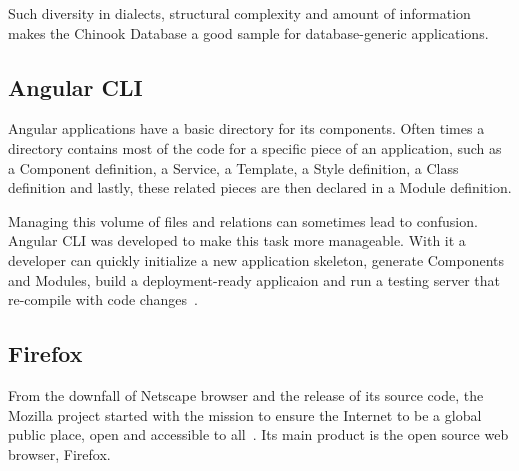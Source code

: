 Such diversity in dialects, structural complexity and amount of information makes the Chinook Database a good sample for database-generic applications.

\subsection{Angular CLI}\label{angularcli}
Angular applications have a basic directory for its components. Often times a directory contains most of the code for a specific piece of an application, such as a Component definition, a Service, a Template, a Style definition, a Class definition and lastly, these related pieces are then declared in a Module definition.

Managing this volume of files and relations can sometimes lead to confusion. Angular \gls{CLI} was developed to make this task more manageable. With it a developer can quickly initialize a new application skeleton, generate Components and Modules, build a deployment-ready applicaion and run a testing server that re-compile with code changes~\cite{angularcli}.

\subsection{Firefox}
From the downfall of Netscape browser and the release of its source code, the Mozilla project started with the mission to ensure the Internet to be a global public place, open and accessible to all~\cite{firemission}. Its main product is the open source web browser, Firefox.

